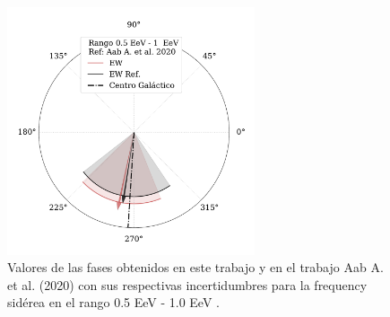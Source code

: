 \documentclass[12pt, doublespace, oneside]{article}
\begin{document}
    \begin{figure}[H]
        \begin{small}
            \begin{center}
                \vspace*{-0.65 cm}
                \includegraphics[width=0.65\textwidth]{Figs/phase_segundo_bin_v3.pdf}
                \vspace*{-1.1 cm}
            \end{center}
            \caption{Valores de las fases obtenidos en este trabajo y en el trabajo Aab A.  et al. (2020) \cite{Aab_2020} con sus respectivas incertidumbres para la frequency sidérea en el rango 0.5 EeV - 1.0 EeV .}
            \label{fig:segundo}
        \end{small}
    \end{figure}
\end{document}
